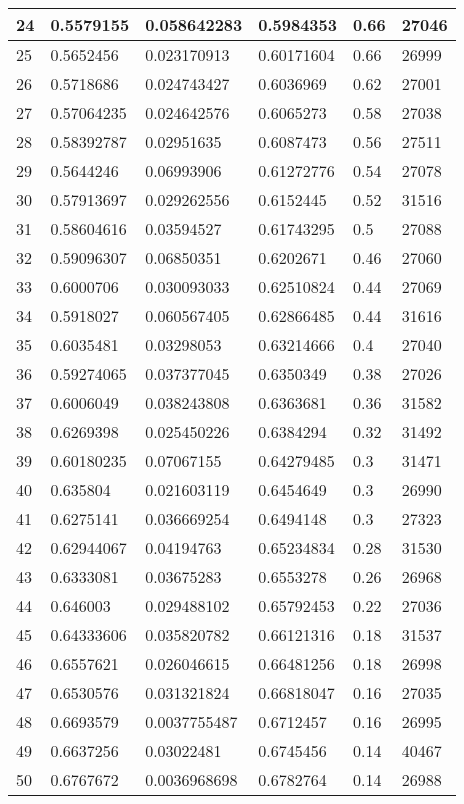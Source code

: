 \begin{longtable}{|l|l|l|l|l|l|}
24 & 0.5579155 & 0.058642283 & 0.5984353 & 0.66 & 27046 \\ \hline 
25 & 0.5652456 & 0.023170913 & 0.60171604 & 0.66 & 26999 \\ \hline 
26 & 0.5718686 & 0.024743427 & 0.6036969 & 0.62 & 27001 \\ \hline 
27 & 0.57064235 & 0.024642576 & 0.6065273 & 0.58 & 27038 \\ \hline 
28 & 0.58392787 & 0.02951635 & 0.6087473 & 0.56 & 27511 \\ \hline 
29 & 0.5644246 & 0.06993906 & 0.61272776 & 0.54 & 27078 \\ \hline 
30 & 0.57913697 & 0.029262556 & 0.6152445 & 0.52 & 31516 \\ \hline 
31 & 0.58604616 & 0.03594527 & 0.61743295 & 0.5 & 27088 \\ \hline 
32 & 0.59096307 & 0.06850351 & 0.6202671 & 0.46 & 27060 \\ \hline 
33 & 0.6000706 & 0.030093033 & 0.62510824 & 0.44 & 27069 \\ \hline 
34 & 0.5918027 & 0.060567405 & 0.62866485 & 0.44 & 31616 \\ \hline 
35 & 0.6035481 & 0.03298053 & 0.63214666 & 0.4 & 27040 \\ \hline 
36 & 0.59274065 & 0.037377045 & 0.6350349 & 0.38 & 27026 \\ \hline 
37 & 0.6006049 & 0.038243808 & 0.6363681 & 0.36 & 31582 \\ \hline 
38 & 0.6269398 & 0.025450226 & 0.6384294 & 0.32 & 31492 \\ \hline 
39 & 0.60180235 & 0.07067155 & 0.64279485 & 0.3 & 31471 \\ \hline 
40 & 0.635804 & 0.021603119 & 0.6454649 & 0.3 & 26990 \\ \hline 
41 & 0.6275141 & 0.036669254 & 0.6494148 & 0.3 & 27323 \\ \hline 
42 & 0.62944067 & 0.04194763 & 0.65234834 & 0.28 & 31530 \\ \hline 
43 & 0.6333081 & 0.03675283 & 0.6553278 & 0.26 & 26968 \\ \hline 
44 & 0.646003 & 0.029488102 & 0.65792453 & 0.22 & 27036 \\ \hline 
45 & 0.64333606 & 0.035820782 & 0.66121316 & 0.18 & 31537 \\ \hline 
46 & 0.6557621 & 0.026046615 & 0.66481256 & 0.18 & 26998 \\ \hline 
47 & 0.6530576 & 0.031321824 & 0.66818047 & 0.16 & 27035 \\ \hline 
48 & 0.6693579 & 0.0037755487 & 0.6712457 & 0.16 & 26995 \\ \hline 
49 & 0.6637256 & 0.03022481 & 0.6745456 & 0.14 & 40467 \\ \hline 
50 & 0.6767672 & 0.0036968698 & 0.6782764 & 0.14 & 26988 \\ \hline 
\end{longtable}